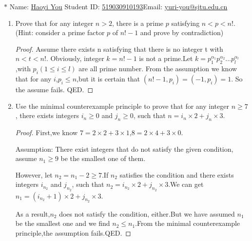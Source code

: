 \documentclass[12pt,a4paper]{article}
\theoremstyle{definition}
\begin{document}
\noindent

\noindent{}
\begin{center}

\footnotesize{\color{blue}$*$ Name: \underline{Haoyi You}  \quad\quad \quad Student ID: \underline{519030910193}\quad\quad \quad Email:  \underline{yuri-you@sjtu.edu.cn}}
\end{center}

\begin{enumerate}
    \item
    Prove that for any integer $n>2$, there is a prime $p$ satisfying $n<p<n!$. {\color{blue}(Hint: consider a prime factor $p$ of $n!-1$ and prove by contradiction)}
    \begin{proof}
        Assume there exists n satisfying that there is no integer t with $n<t<n!$. Obviously, integer $k=n!-1$ is not a prime.Let $k=p_1^{{\alpha}_1}p_2^{{\alpha}_2}...p_l^{{\alpha}_l}$,with $p_i(1\leq i\leq l)$ are all prime number. From the assumption we know that for any $i$,$p_i \le n$,but it is certain that $(n!-1,p_i)=(-1,p_i)=1$. So the assume fails. QED.
        
    \end{proof}

    \item
    Use the minimal counterexample principle to prove that for any integer $n\ge 7$, there exists integers $i_n\ge 0$ and $j_n\ge 0$, such that $n = i_n \times 2 + j_n \times 3$.
    \begin{proof}
    First,we know $7=2\times 2+3\times 1$,$8=2\times 4+3\times 0$.
    
    Assumption: There exist integers that do not satisfy the given condition, assume $n_1\geq 9$ be the smallest one of them. 
    
    However, let $n_2=n_1-2\geq 7$.If $n_2$  satisfies the condition and there exists integers $i_{n_2}$ and $j_{n_2}$, such that $n_2=i_{n_2}\times 2+j_{n_2}\times 3$.We can get $n_1=(i_{n_2}+1)\times 2+j_{n_2}\times 3$.
    
    As a result,$n_2$ does not satisfy the condition, either.But we have assumed $n_1$ be the smallest one and we find $n_2\leq n_1$.From the minimal counterexample principle,the assumption fails.QED.
    \end{proof}


\end{enumerate}
\end{document}
